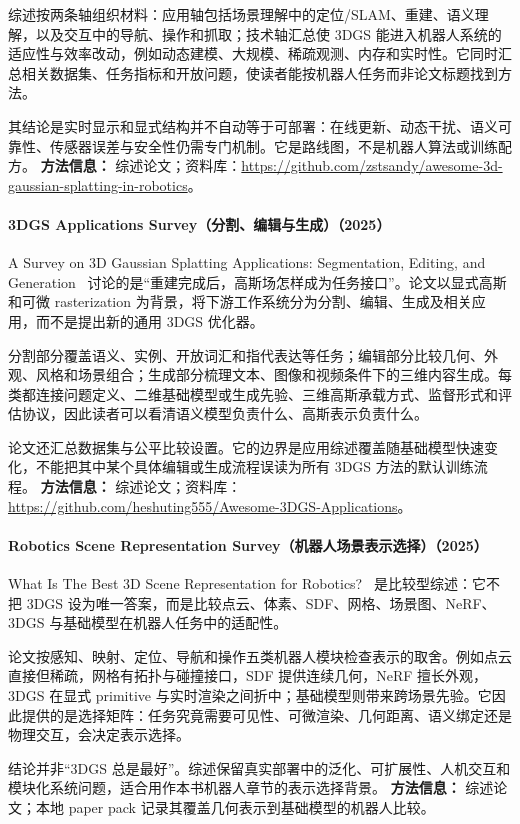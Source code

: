 综述按两条轴组织材料：应用轴包括场景理解中的定位/SLAM、重建、语义理解，以及交互中的导航、操作和抓取；技术轴汇总使 3DGS 能进入机器人系统的适应性与效率改动，例如动态建模、大规模、稀疏观测、内存和实时性。它同时汇总相关数据集、任务指标和开放问题，使读者能按机器人任务而非论文标题找到方法。

其结论是实时显示和显式结构并不自动等于可部署：在线更新、动态干扰、语义可靠性、传感器误差与安全性仍需专门机制。它是路线图，不是机器人算法或训练配方。
\textbf{方法信息：} 综述论文；资料库：\url{https://github.com/zstsandy/awesome-3d-gaussian-splatting-in-robotics}。
\paragraph{3DGS Applications Survey（分割、编辑与生成）（2025）}
A Survey on 3D Gaussian Splatting Applications: Segmentation, Editing, and Generation~\cite{2508_09977} 讨论的是“重建完成后，高斯场怎样成为任务接口”。论文以显式高斯和可微 rasterization 为背景，将下游工作系统分为分割、编辑、生成及相关应用，而不是提出新的通用 3DGS 优化器。

分割部分覆盖语义、实例、开放词汇和指代表达等任务；编辑部分比较几何、外观、风格和场景组合；生成部分梳理文本、图像和视频条件下的三维内容生成。每类都连接问题定义、二维基础模型或生成先验、三维高斯承载方式、监督形式和评估协议，因此读者可以看清语义模型负责什么、高斯表示负责什么。

论文还汇总数据集与公平比较设置。它的边界是应用综述覆盖随基础模型快速变化，不能把其中某个具体编辑或生成流程误读为所有 3DGS 方法的默认训练流程。
\textbf{方法信息：} 综述论文；资料库：\url{https://github.com/heshuting555/Awesome-3DGS-Applications}。
\paragraph{Robotics Scene Representation Survey（机器人场景表示选择）（2025）}
What Is The Best 3D Scene Representation for Robotics?~\cite{2512_03422} 是比较型综述：它不把 3DGS 设为唯一答案，而是比较点云、体素、SDF、网格、场景图、NeRF、3DGS 与基础模型在机器人任务中的适配性。

论文按感知、映射、定位、导航和操作五类机器人模块检查表示的取舍。例如点云直接但稀疏，网格有拓扑与碰撞接口，SDF 提供连续几何，NeRF 擅长外观，3DGS 在显式 primitive 与实时渲染之间折中；基础模型则带来跨场景先验。它因此提供的是选择矩阵：任务究竟需要可见性、可微渲染、几何距离、语义绑定还是物理交互，会决定表示选择。

结论并非“3DGS 总是最好”。综述保留真实部署中的泛化、可扩展性、人机交互和模块化系统问题，适合用作本书机器人章节的表示选择背景。
\textbf{方法信息：} 综述论文；本地 paper pack 记录其覆盖几何表示到基础模型的机器人比较。
